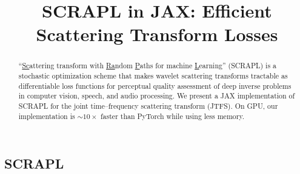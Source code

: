 \documentclass{article}
\title{SCRAPL in JAX: Efficient Scattering Transform Losses}
\begin{document}
\tenpt
\maketitle

\begin{sloppy}
\vspace*{-32.9pt}
\begin{abstract}
``\underline{Sc}attering transform with \underline{Ra}ndom \underline{P}aths for machine \underline{L}earning'' (SCRAPL) is a stochastic optimization scheme that makes wavelet scattering transforms tractable as differentiable loss functions for perceptual quality assessment of deep inverse problems in computer vision, speech, and audio processing.
We present a JAX implementation of SCRAPL for the joint time--frequency scattering transform (JTFS).
On GPU, our implementation is ${\sim}10\times$ faster than PyTorch while using less memory.
\end{abstract}



\vspace{-8pt}
\section{SCRAPL}
\label{sec:scrapl}
\vspace{-5pt}


\end{sloppy}
\end{document}
